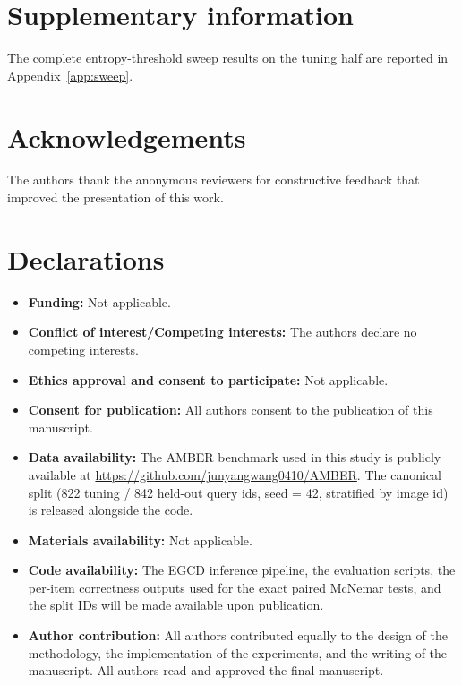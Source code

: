 \documentclass[pdflatex,sn-basic,Numbered]{sn-jnl}
\theoremstyle{thmstyleone}
\theoremstyle{thmstyletwo}
\theoremstyle{thmstylethree}
\begin{document}
\backmatter

\section*{Supplementary information}

The complete entropy-threshold sweep results on the tuning half are reported in Appendix~\ref{app:sweep}.

\section*{Acknowledgements}

The authors thank the anonymous reviewers for constructive feedback that improved the presentation of this work.

\section*{Declarations}

\begin{itemize}
\item \textbf{Funding:} Not applicable.
\item \textbf{Conflict of interest/Competing interests:} The authors declare no competing interests.
\item \textbf{Ethics approval and consent to participate:} Not applicable.
\item \textbf{Consent for publication:} All authors consent to the publication of this manuscript.
\item \textbf{Data availability:} The AMBER benchmark used in this study is publicly available at \url{https://github.com/junyangwang0410/AMBER}. The canonical split (822 tuning / 842 held-out query ids, seed = 42, stratified by image id) is released alongside the code.
\item \textbf{Materials availability:} Not applicable.
\item \textbf{Code availability:} The EGCD inference pipeline, the evaluation scripts, the per-item correctness outputs used for the exact paired McNemar tests, and the split IDs will be made available upon publication.
\item \textbf{Author contribution:} All authors contributed equally to the design of the methodology, the implementation of the experiments, and the writing of the manuscript. All authors read and approved the final manuscript.
\end{itemize}
\end{document}
